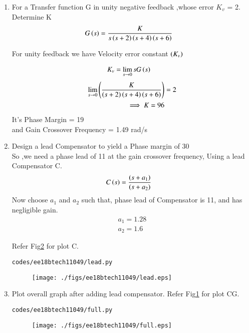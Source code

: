 \begin{enumerate}[label=\thesection.\arabic*.,ref=\thesection.\theenumi]

\item For a Transfer function G in unity negative feedback ,whose error  $K_v$ = 2. Determine K 
\begin{align}
G\brak{s} &= \frac{K}{s\brak{s+2}\brak{s+4}\brak{s+6}}
\label{eq:ee18btech11049_system}
\end{align}




\solution For unity feedback we have Velocity error constant $\left(K_v\right)$

\begin{align}
K_v &= \lim_{s \to 0} s G\left(s\right) 
\end{align}
\begin{align}
\lim_{s \to 0} \left(\frac{K}{\left(s+2\right)\left(s+4\right)\left(s+6\right)} \right)& = 2 \\
\implies K = 96
\end{align}
It's Phase Margin  = 19\degree\\
and Gain Crossover Frequency = 1.49 rad/s

\item Design a lead Compensator to yield a Phase margin of 30\degree \\
\solution So ,we need a phase lead of 11 at the gain crossover frequency, Using a lead Compensator C.
\begin{align}
    C\left(s\right) &= \frac{\left(s+a_1\right)}{\left(s+a_2\right)}
\end{align}{}
Now choose $a_1$ and $a_2$  such that, phase lead of Compensator is 11, and has negligible gain.
\begin{align}
    a_1 = 1.28\\
    a_2 = 1.6
\end{align}


Refer Fig\ref{fig:total} for plot C.
\begin{lstlisting}
codes/ee18btech11049/lead.py
\end{lstlisting}

\begin{figure}[!h]
\centering
  \texttt{[image: ./figs/ee18btech11049/lead.eps]}
  \caption{}
  \label{fig:lead}
\end{figure}
\item Plot overall graph after adding lead compensator.
Refer Fig\ref{fig:lead} for plot CG.
\begin{lstlisting}
codes/ee18btech11049/full.py
\end{lstlisting}
\begin{figure}[!h]
\centering
  \texttt{[image: ./figs/ee18btech11049/full.eps]}
  \caption{}
  \label{fig:total}
\end{figure}




\end{enumerate}
